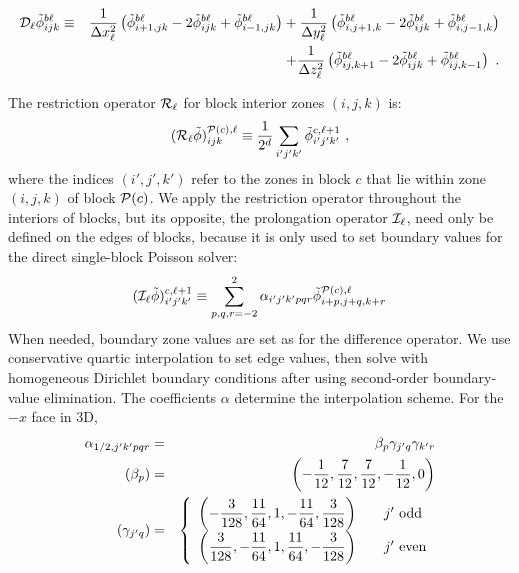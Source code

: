 \begin{eqnarray}  %
{\cal D}_\ell\tilde\phi^{b\ell}_{ijk} & \equiv &
 {1\over\Delta x_\ell^2}\left(\tilde\phi^{b\ell}_{i+1,jk} -
                              2\tilde\phi^{b\ell}_{ijk} +
                              \tilde\phi^{b\ell}_{i-1,jk}\right)+ 
 {1\over\Delta y_\ell^2}\left(\tilde\phi^{b\ell}_{i,j+1,k} -
                              2\tilde\phi^{b\ell}_{ijk} +
                              \tilde\phi^{b\ell}_{i,j-1,k}\right)  \\
 & & + {1\over\Delta z_\ell^2}\left(\tilde\phi^{b\ell}_{ij,k+1} -
                              2\tilde\phi^{b\ell}_{ijk} +
                              \tilde\phi^{b\ell}_{ij,k-1}\right)\ .
\end{eqnarray}

The restriction operator ${\cal R}_\ell$ for block interior zones $(i,j,k)$ is:
\begin{equation}
({\cal R}_\ell\tilde\phi)^{{\cal P}(c),\ell}_{ijk} \equiv {1 \over {2^d}}
  \sum_{i'j'k'}
  \tilde\phi^{c,\ell+1}_{i'j'k'}\ ,
\end{equation}
where the indices $(i',j',k')$ refer to the zones in block $c$ that lie within
zone $(i,j,k)$ of block ${\cal P}(c)$.  We apply the restriction operator
throughout the interiors of blocks, but its opposite, the prolongation operator
${\cal I}_\ell$, need only be defined on the edges of blocks, because it is only
used to set boundary values for the direct single-block Poisson solver:
\begin{equation}
({\cal I}_\ell\tilde\phi)^{c,\ell+1}_{i'j'k'} \equiv \sum_{p,q,r = -2}^2
                 \alpha_{i'j'k'pqr}\tilde\phi^{{\cal P}(c),\ell}_{i+p,j+q,k+r}
\end{equation}
When needed, boundary zone values are set as for the difference operator.  We
use conservative quartic interpolation to set edge values, then solve with
homogeneous Dirichlet boundary conditions after using second-order
boundary-value elimination.  The coefficients $\alpha$ determine the
interpolation scheme. For the $-x$ face in 3D,
\begin{eqnarray}
\alpha_{1/2,j'k'pqr} &=& \beta_p \gamma_{j'q} \gamma_{k'r} \\
\nonumber
(\beta_p) &=& \left( -{1\over{12}}, {7\over{12}}, {7\over{12}},
                    -{1\over{12}}, 0 \right) \\
\nonumber
(\gamma_{j'q}) &=& \left\{\begin{array}{ll}\displaystyle
                   \left( -{3\over{128}}, {{11}\over{64}},
                                    1, -{{11}\over{64}}, {3\over{128}}\right)
                              & \ \ \ j' {\rm\ odd} \\
                   \displaystyle
                   \left( {3\over{128}}, -{{11}\over{64}},
                                    1, {{11}\over{64}}, -{3\over{128}}\right)
                              & \ \ \ j' {\rm\ even} 
                  \end{array} \right.
\end{eqnarray}
